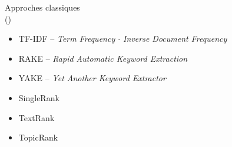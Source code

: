\begin{frame}{Approches classiques\\ {\small(\hypersetup{citecolor=yellow}\cite{garaudclassiques})}}
\pause
\begin{itemize}[<+->]
\small
\item \textsc{TF-IDF} -- \textit{Term Frequency $\cdot$ Inverse Document Frequency} \hfill \citep{sparck1972statistical}
\item \textsc{RAKE} -- \textit{Rapid Automatic Keyword Extraction} \hfill \citep{rose2010automatic}
\item \textsc{YAKE} -- \textit{Yet Another Keyword Extractor} \hfill \citep{CAMPOS2020257}
\end{itemize}

\pause
\begin{itemize}[<+->]
\small
\item SingleRank \hfill \citep{wan2008}
\item TextRank \hfill \citep{mihalcea2004}
\item TopicRank \hfill \citep{bougouin2013topicrank}
\end{itemize}

\end{frame}

